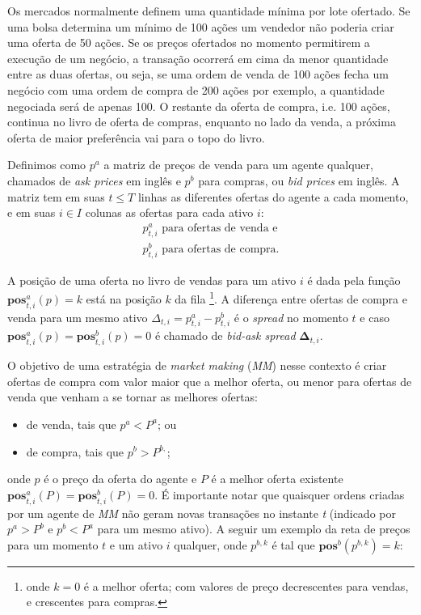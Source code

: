 Os mercados normalmente definem uma quantidade mínima por lote ofertado. Se uma bolsa determina um mínimo de 100 ações um vendedor não poderia criar uma oferta de 50 ações. Se os preços ofertados no momento permitirem a execução de um negócio, a transação ocorrerá em cima da menor quantidade entre as duas ofertas, ou seja, se uma ordem de venda de 100 ações fecha um negócio com uma ordem de compra de 200 ações por exemplo, a quantidade negociada será de apenas 100. O restante da oferta de compra, i.e. 100 ações, continua no livro de oferta de compras, enquanto no lado da venda, a próxima oferta de maior preferência vai para o topo do livro. 

Definimos como $p^{a}$ a matriz de preços de venda para um agente qualquer, chamados de \textit{ask prices} em inglês e $p^{b}$ para compras, ou \textit{bid prices} em inglês. A matriz tem em suas $t \leq T$ linhas as diferentes ofertas do agente a cada momento, e em suas $i \in I$ colunas as ofertas para cada ativo $i$: 
\begin{equation*}
	\begin{aligned}
		p^{a}_{t, i} \text{ para ofertas de venda e}  \\
		p^{b}_{t, i} \text{ para ofertas de compra.}
	\end{aligned}
\end{equation*}

A posição de uma oferta no livro de vendas para um ativo $i$ é dada pela função $\mathbf{pos}_{t, i}^{a}(p) = k$ está na posição $k$ da fila \footnote{onde $k = 0$ é a melhor oferta; com valores de preço decrescentes para vendas, e crescentes para compras.}. A diferença entre ofertas de compra e venda para um mesmo ativo $\Delta_{t, i} = p_{t, i}^{a} - p_{t, i}^{b}$ é o \textit{spread} no momento $t$ e caso $\mathbf{pos}_{t, i}^{a}(p) = \mathbf{pos}_{t, i}^{b}(p) = 0$ é chamado de \textit{bid-ask spread} $\mathbf{\Delta}_{t, i}$.

O objetivo de uma estratégia de \textit{market making} (\textit{MM}) nesse contexto é criar ofertas de compra com valor maior que a melhor oferta, ou menor para ofertas de venda que venham a se tornar as melhores ofertas:

\begin{itemize}
    \item de venda, tais que $p^{a} < P^{a}$; ou 
    \item de compra, tais que $p^{b} > P^{b,}$;
\end{itemize}

onde $p$ é o preço da oferta do agente e $P$ é a melhor oferta existente $\mathbf{pos}_{t, i}^{a}(P) = \mathbf{pos}_{t, i}^{b}(P) = 0$.
É importante notar que quaisquer ordens criadas por um agente de \textit{MM} não geram novas transações no instante \textit{t} (indicado por $p^{a} > P^{b}$ e $p^{b} < P^{a}$ para um mesmo ativo). A seguir um exemplo da reta de preços para um momento $t$ e um ativo $i$ qualquer, onde $p^{b, k}$ é tal que $\mathbf{pos}^{b}(p^{b, k}) = k$:

